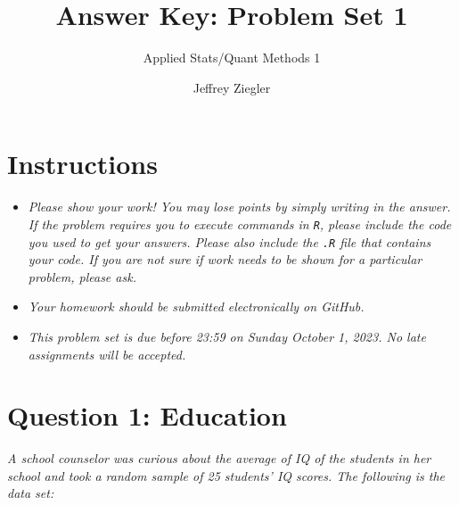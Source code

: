 \documentclass[12pt,letterpaper]{article}
\title{Answer Key: Problem Set 1}
\date{Jeffrey Ziegler}
\author{Applied Stats/Quant Methods 1}
\begin{document}
	\maketitle
	
	\section*{Instructions}
\begin{itemize}
	\item \textit{Please show your work! You may lose points by simply writing in the answer. If the problem requires you to execute commands in \texttt{R}, please include the code you used to get your answers. Please also include the \texttt{.R} file that contains your code. If you are not sure if work needs to be shown for a particular problem, please ask.}
	\item \textit{Your homework should be submitted electronically on GitHub.}
	\item \textit{This problem set is due before 23:59 on Sunday October 1, 2023. No late assignments will be accepted.}
\end{itemize}

\vspace{1cm}
\section*{Question 1: Education}

\textit{A school counselor was curious about the average of IQ of the students in her school and took a random sample of 25 students' IQ scores. The following is the data set:}\\
\vspace{.25cm}

  

\vspace{.5cm}
\end{document}
